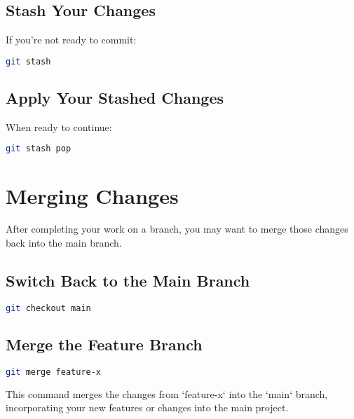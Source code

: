 \documentclass{article}
\begin{document}
\subsection{Stash Your Changes}

If you're not ready to commit:

\begin{lstlisting}[language=bash]
git stash
\end{lstlisting}

\subsection{Apply Your Stashed Changes}

When ready to continue:

\begin{lstlisting}[language=bash]
git stash pop
\end{lstlisting}

\section{Merging Changes}

After completing your work on a branch, you may want to merge those changes back into the main branch.

\subsection{Switch Back to the Main Branch}

\begin{lstlisting}[language=bash]
git checkout main
\end{lstlisting}

\subsection{Merge the Feature Branch}

\begin{lstlisting}[language=bash]
git merge feature-x
\end{lstlisting}

This command merges the changes from `feature-x` into the `main` branch, incorporating your new features or changes into the main project.
\end{document}
